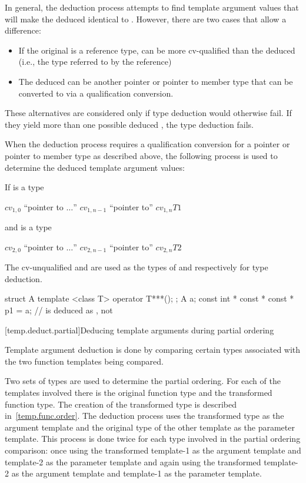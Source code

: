 \pnum
In general, the deduction process attempts to find template argument
values that will make the deduced
identical to
.
However, there are two cases that allow a difference:

\begin{itemize}
\item
If the original
is a reference type,
can be more cv-qualified
than the deduced
(i.e., the type referred to by the reference)
\item
The deduced
can be another pointer or pointer to member type that
can be converted to
via a qualification conversion.
\end{itemize}

\pnum
These alternatives are considered only if type deduction would
otherwise fail.
If they yield more than one possible deduced
,
the type deduction fails.

\pnum
When the deduction process requires a qualification conversion for a
pointer or pointer to member type as described above, the following
process is used to determine the deduced template argument values:

If
is a type
\begin{indented}
$\mathit{cv}_{1,0}$ ``pointer to $\ldots$'' $\mathit{cv}_{1,n-1}$ ``pointer to''
$\mathit{cv}_{1,n}\mathit{T1}$
\end{indented}
and
is a type
\begin{indented}
$\mathit{cv}_{2,0}$ ``pointer to $\ldots$'' $\mathit{cv}_{2,n-1}$ ``pointer to''
$\mathit{cv}_{2,n}\mathit{T2}$
\end{indented}
The cv-unqualified
and
are used as the types of
and
respectively for type deduction.
\enterexample
\begin{codeblock}
struct A {
  template <class T> operator T***();
};
A a;
const int * const * const * p1 = a;     //  is deduced as , not 
\end{codeblock}
\exitexample

[temp.deduct.partial]{Deducing template arguments during partial ordering}

\pnum
Template argument deduction is done by comparing certain types associated with
the two function templates being compared.

\pnum
Two sets of types are used to determine the partial ordering.  For each of
the templates involved there is the original function type and the
transformed function type.
\enternote
The creation of the transformed type is described in~\ref{temp.func.order}.
\exitnote
The deduction process uses the
transformed type as the argument template and the original type of the
other template as the parameter template.  This process is done twice
for each type involved in the partial ordering comparison: once using
the transformed template-1 as the argument template and template-2 as
the parameter template and again using the transformed template-2 as
the argument template and template-1 as the parameter template.

